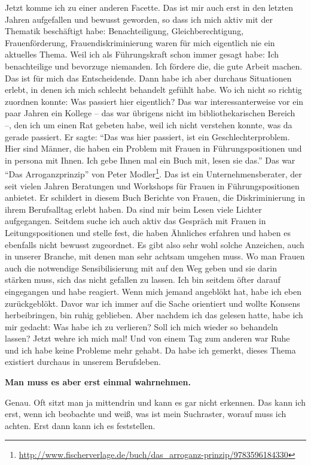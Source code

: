 \documentclass[a4paper,
fontsize=11pt,
oneside,
numbers=noperiodatend,
parskip=half-,
bibliography=totoc,
final
]{scrartcl}
\begin{document}
Jetzt komme ich zu einer anderen Facette. Das ist mir auch erst in den
letzten Jahren aufgefallen und bewusst geworden, so dass ich mich aktiv
mit der Thematik beschäftigt habe: Benachteiligung, Gleichberechtigung,
Frauenförderung, Frauendiskriminierung waren für mich eigentlich nie ein
aktuelles Thema. Weil ich als Führungskraft schon immer gesagt habe: Ich
benachteilige und bevorzuge niemanden. Ich fördere die, die gute Arbeit
machen. Das ist für mich das Entscheidende. Dann habe ich aber durchaus
Situationen erlebt, in denen ich mich schlecht behandelt gefühlt habe.
Wo ich nicht so richtig zuordnen konnte: Was passiert hier eigentlich?
Das war interessanterweise vor ein paar Jahren ein Kollege -- das war
übrigens nicht im bibliothekarischen Bereich~ --, den ich um einen Rat
gebeten habe, weil ich nicht verstehen konnte, was da gerade passiert.
Er sagte: \enquote{Das was hier passiert, ist ein Geschlechterproblem.
Hier sind Männer, die haben ein Problem mit Frauen in Führungspositionen
und in persona mit Ihnen. Ich gebe Ihnen mal ein Buch mit, lesen sie
das.} Das war \enquote{Das Arroganzprinzip} von Peter Modler\footnote{\url{http://www.fischerverlage.de/buch/das_arroganz-prinzip/9783596184330}}.
Das ist ein Unternehmensberater, der seit vielen Jahren Beratungen und
Workshops für Frauen in Führungspositionen anbietet. Er schildert in
diesem Buch Berichte von Frauen, die Diskriminierung in ihrem
Berufsalltag erlebt haben. Da sind mir beim Lesen viele Lichter
aufgegangen. Seitdem suche ich auch aktiv das Gespräch mit Frauen in
Leitungspositionen und stelle fest, die haben Ähnliches erfahren und
haben es ebenfalls nicht bewusst zugeordnet. Es gibt also sehr wohl
solche Anzeichen, auch in unserer Branche, mit denen man sehr achtsam
umgehen muss. Wo man Frauen auch die notwendige Sensibilisierung mit auf
den Weg geben und sie darin stärken muss, sich das nicht gefallen zu
lassen. Ich bin seitdem öfter darauf eingegangen und habe reagiert. Wenn
mich jemand angeblökt hat, habe ich eben zurückgeblökt. Davor war ich
immer auf die Sache orientiert und wollte Konsens herbeibringen, bin
ruhig geblieben. Aber nachdem ich das gelesen hatte, habe ich mir
gedacht: Was habe ich zu verlieren? Soll ich mich wieder so behandeln
lassen? Jetzt wehre ich mich mal! Und von einem Tag zum anderen war Ruhe
und ich habe keine Probleme mehr gehabt. Da habe ich gemerkt, dieses
Thema existiert durchaus in unserem Berufsleben.

\textbf{Man muss es aber erst einmal wahrnehmen.}

Genau. Oft sitzt man ja mittendrin und kann es gar nicht erkennen. Das
kann ich erst, wenn ich beobachte und weiß, was ist mein Suchraster,
worauf muss ich achten. Erst dann kann ich es feststellen.
\end{document}
